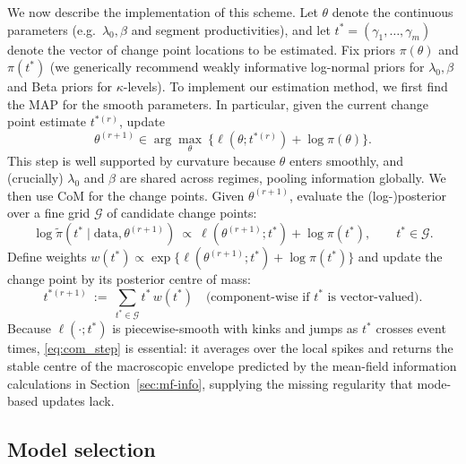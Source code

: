 \documentclass{article}
\theoremstyle{plain}
\theoremstyle{definition}
\newcommand{\1}{\mathbf{1}}
\begin{document}
We now describe the implementation of this scheme. Let $\theta$ denote the continuous parameters (e.g.\ $\lambda_0,\beta$ and segment productivities), and let $t^\ast = (\gamma_1, \dots, \gamma_{m})$ denote the vector of change point locations to be estimated.
Fix priors $\pi(\theta)$ and $\pi(t^\ast)$ (we generically recommend weakly informative log-normal priors for $\lambda_0,\beta$
and Beta priors for $\kappa$-levels). To implement our estimation method, we first find the MAP for the smooth parameters. In particular, given the current change point estimate $t^{\ast{(r)}}$, update
\begin{equation}
\label{eq:map_step}
\theta^{(r+1)} \in \arg\max_{\theta}\ \Big\{\ell(\theta;t^{\ast{(r)}}) + \log\pi(\theta)\Big\}.
\end{equation}
This step is well supported by curvature because $\theta$ enters smoothly, and (crucially) $\lambda_0$ and $\beta$
are shared across regimes, pooling information globally. We then use CoM for the change points. Given $\theta^{(r+1)}$, evaluate the (log-)posterior over a fine grid $\mathcal G$ of candidate change points:
\[
\log \widetilde \pi(t^\ast\mid\text{data},\theta^{(r+1)})\ \propto\ \ell(\theta^{(r+1)};t^\ast) + \log\pi(t^\ast),
\qquad t^\ast\in\mathcal G.
\]
Define weights $w(t^\ast)\propto \exp\{\ell(\theta^{(r+1)};t^\ast)+\log\pi(t^\ast)\}$ and update the change point by its
posterior centre of mass:
\begin{equation}
\label{eq:com_step}
t^{\ast{(r+1)}} \ :=\ \sum_{t^\ast\in\mathcal G} t^\ast\, w(t^\ast)
\quad\text{(component-wise if $t^\ast$ is vector-valued)}.
\end{equation}
Because $\ell(\cdot;t^\ast)$ is piecewise-smooth with kinks and jumps as $t^\ast$ crosses event times,
\eqref{eq:com_step} is essential: it averages over the local spikes and returns the stable centre of the macroscopic
envelope predicted by the mean-field information calculations in Section~\ref{sec:mf-info}, supplying the missing regularity that mode-based updates lack.

\subsection{Model selection}
\end{document}
